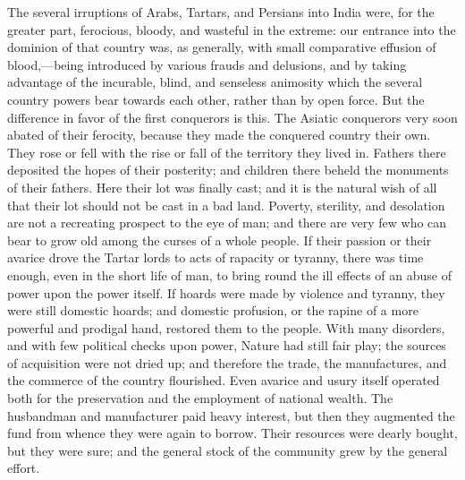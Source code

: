 The several irruptions of Arabs, Tartars, and Persians into India were, for the greater part, ferocious, bloody, and wasteful in the extreme: our entrance into the dominion of that country was, as generally, with small comparative effusion of blood,—being introduced by various frauds and delusions, and by taking advantage of the incurable, blind, and senseless animosity which the several country powers bear towards each other, rather than by open force. But the difference in favor of the first conquerors is this. The Asiatic conquerors very soon abated of their ferocity, because they made the conquered country their own. They rose or fell with the rise or fall of the territory they lived in. Fathers there deposited the hopes of their posterity; and children there beheld the monuments of their fathers. Here their lot was finally cast; and it is the natural wish of all that their lot should not be cast in a bad land. Poverty, sterility, and desolation are not a recreating prospect to the eye of man; and there are very few who can bear to grow old among the curses of a whole people. If their passion or their avarice drove the Tartar lords to acts of rapacity or tyranny, there was time enough, even in the short life of man, to bring round the ill effects of an abuse of power upon the power itself. If hoards were made by violence and tyranny, they were still domestic hoards; and domestic profusion, or the rapine of a more powerful and prodigal hand, restored them to the people. With many disorders, and with few political checks upon power, Nature had still fair play; the sources of acquisition were not dried up; and therefore the trade, the manufactures, and the commerce of the country flourished. Even avarice and usury itself operated both for the preservation and the employment of national wealth. The husbandman and manufacturer paid heavy interest, but then they augmented the fund from whence they were again to borrow. Their resources were dearly bought, but they were sure; and the general stock of the community grew by the general effort.

